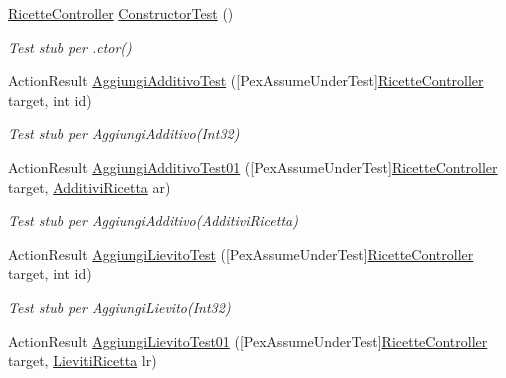 \begin{DoxyCompactItemize}
\item 
\mbox{\hyperlink{class_brew_day2_1_1_controllers_1_1_ricette_controller}{Ricette\+Controller}} \mbox{\hyperlink{class_brew_day2_1_1_controllers_1_1_tests_1_1_ricette_controller_test_a3bafb0757675930c069a733007628333}{Constructor\+Test}} ()
\begin{DoxyCompactList}\small\item\em Test stub per .ctor()\end{DoxyCompactList}\item 
Action\+Result \mbox{\hyperlink{class_brew_day2_1_1_controllers_1_1_tests_1_1_ricette_controller_test_a58640900b7cbca203404d4fff3ad46ee}{Aggiungi\+Additivo\+Test}} (\mbox{[}Pex\+Assume\+Under\+Test\mbox{]}\mbox{\hyperlink{class_brew_day2_1_1_controllers_1_1_ricette_controller}{Ricette\+Controller}} target, int id)
\begin{DoxyCompactList}\small\item\em Test stub per Aggiungi\+Additivo(\+Int32)\end{DoxyCompactList}\item 
Action\+Result \mbox{\hyperlink{class_brew_day2_1_1_controllers_1_1_tests_1_1_ricette_controller_test_a3cb8e48338ee50baca978399b4a0b88c}{Aggiungi\+Additivo\+Test01}} (\mbox{[}Pex\+Assume\+Under\+Test\mbox{]}\mbox{\hyperlink{class_brew_day2_1_1_controllers_1_1_ricette_controller}{Ricette\+Controller}} target, \mbox{\hyperlink{class_brew_day2_1_1_models_1_1_additivi_ricetta}{Additivi\+Ricetta}} ar)
\begin{DoxyCompactList}\small\item\em Test stub per Aggiungi\+Additivo(\+Additivi\+Ricetta)\end{DoxyCompactList}\item 
Action\+Result \mbox{\hyperlink{class_brew_day2_1_1_controllers_1_1_tests_1_1_ricette_controller_test_ae64be8de7561f993b36ae13bc310ac04}{Aggiungi\+Lievito\+Test}} (\mbox{[}Pex\+Assume\+Under\+Test\mbox{]}\mbox{\hyperlink{class_brew_day2_1_1_controllers_1_1_ricette_controller}{Ricette\+Controller}} target, int id)
\begin{DoxyCompactList}\small\item\em Test stub per Aggiungi\+Lievito(\+Int32)\end{DoxyCompactList}\item 
Action\+Result \mbox{\hyperlink{class_brew_day2_1_1_controllers_1_1_tests_1_1_ricette_controller_test_a24bd6fbdd648510a6cf0c7beaa5fd41c}{Aggiungi\+Lievito\+Test01}} (\mbox{[}Pex\+Assume\+Under\+Test\mbox{]}\mbox{\hyperlink{class_brew_day2_1_1_controllers_1_1_ricette_controller}{Ricette\+Controller}} target, \mbox{\hyperlink{class_brew_day2_1_1_models_1_1_lieviti_ricetta}{Lieviti\+Ricetta}} lr)

\end{DoxyCompactItemize}
